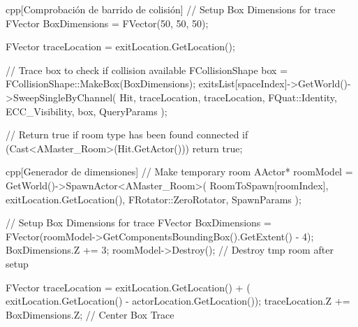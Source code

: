 \documentclass{../../Styles/AI-Research-STY}
\begin{document}
\begin{Form}
    \begin{codeBlock}{cpp}[Comprobación de barrido de colisión]
// Setup Box Dimensions for trace
FVector BoxDimensions = FVector(50, 50, 50);

FVector traceLocation = exitLocation.GetLocation();

// Trace box to check if collision available
FCollisionShape box = FCollisionShape::MakeBox(BoxDimensions);
exitsList[spaceIndex]->GetWorld()->SweepSingleByChannel(
    Hit,
    traceLocation,
    traceLocation,
    FQuat::Identity,
    ECC_Visibility,
    box,
    QueryParams
);

// Return true if room type has been found connected
if (Cast<AMaster_Room>(Hit.GetActor())) return true;
    \end{codeBlock}


    \begin{codeBlock}{cpp}[Generador de dimensiones]
// Make temporary room
AActor* roomModel = GetWorld()->SpawnActor<AMaster_Room>(
    RoomToSpawn[roomIndex],
    exitLocation.GetLocation(),
    FRotator::ZeroRotator,
    SpawnParams
);

// Setup Box Dimensions for trace
FVector BoxDimensions = FVector(roomModel->GetComponentsBoundingBox().GetExtent() - 4);
BoxDimensions.Z += 3;
roomModel->Destroy(); // Destroy tmp room after setup

FVector traceLocation = exitLocation.GetLocation() + (
    exitLocation.GetLocation() - actorLocation.GetLocation());
traceLocation.Z += BoxDimensions.Z; // Center Box Trace


\end{codeBlock}
\end{Form}
\end{document}

